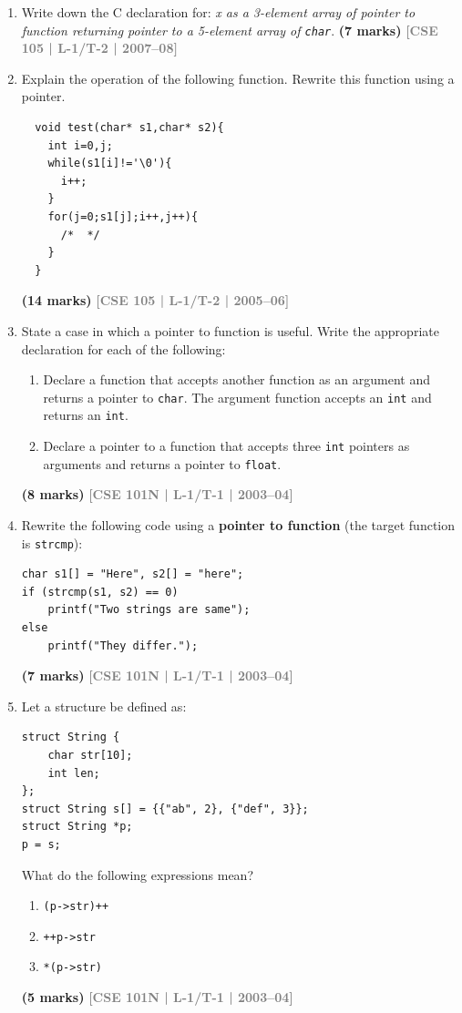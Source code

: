 \documentclass[12pt,a3paper]{article}
\newcommand{\yr}[1]{\hfill\textcolor{gray}{\small\textbf{[#1]}}}
\newcommand{\mk}[1]{\textcolor{orange!70!black}{\small\textbf{(#1 marks)}}}
\begin{document}
\begin{enumerate}
\item Write down the C declaration for: \textit{x as a 3-element array of pointer to function returning pointer to a 5-element array of \texttt{char}}.
\mk{7} \yr{CSE 105 | L-1/T-2 | 2007--08}

\item Explain the operation of the following function. Rewrite this function using a pointer.
\begin{lstlisting}
  void test(char* s1,char* s2){
    int i=0,j;
    while(s1[i]!='\0'){
      i++;
    }
    for(j=0;s1[j];i++,j++){
      /*  */
    }
  }
\end{lstlisting}

\mk{14} \yr{CSE 105 | L-1/T-2 | 2005--06}

\item State a case in which a pointer to function is useful. Write the appropriate declaration for each of the following:
\begin{enumerate}
  \item Declare a function that accepts another function as an argument and returns a pointer to \texttt{char}. The argument function accepts an \texttt{int} and returns an \texttt{int}.
  \item Declare a pointer to a function that accepts three \texttt{int} pointers as arguments and returns a pointer to \texttt{float}.
\end{enumerate}
\mk{8} \yr{CSE 101N | L-1/T-1 | 2003--04}

\item Rewrite the following code using a \textbf{pointer to function} (the target function is \texttt{strcmp}):
 
\begin{lstlisting}
char s1[] = "Here", s2[] = "here";
if (strcmp(s1, s2) == 0)
    printf("Two strings are same");
else
    printf("They differ.");
\end{lstlisting}
\mk{7} \yr{CSE 101N | L-1/T-1 | 2003--04}

\item Let a structure be defined as:
\begin{lstlisting}
struct String {
    char str[10];
    int len;
};
struct String s[] = {{"ab", 2}, {"def", 3}};
struct String *p;
p = s;
\end{lstlisting}
 
What do the following expressions mean?
\begin{enumerate}
  \item \texttt{(p->str)++}
  \item \texttt{++p->str}
  \item \texttt{*(p->str)}
\end{enumerate}
\mk{5} \yr{CSE 101N | L-1/T-1 | 2003--04}

\end{enumerate}
\end{document}
